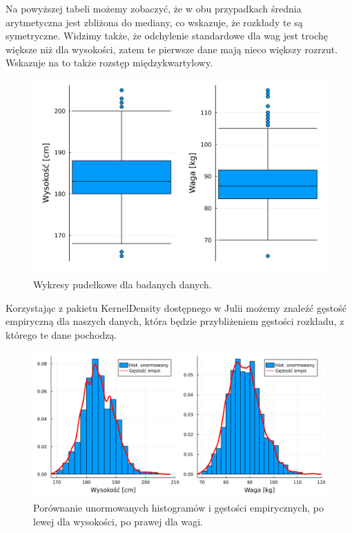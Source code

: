 \documentclass[12pt]{mwart}
\begin{document}
	Na powyższej tabeli możemy zobaczyć, że w obu przypadkach średnia arytmetyczna jest zbliżona do mediany, co wskazuje, że rozkłady te są symetryczne. Widzimy także, że odchylenie standardowe dla wag jest trochę większe niż dla wysokości, zatem te pierwsze dane mają nieco większy rozrzut. Wskazuje na to także rozstęp międzykwartylowy. 
	
	\begin{figure}[H]
		\centering
		\includegraphics[scale=0.1]{images/boxplot.png}
		\caption{Wykresy pudełkowe dla badanych danych.}
	\end{figure}
	
	\newpage
	Korzystając z pakietu KernelDensity dostępnego w Julii możemy znaleźć gęstość empiryczną dla naszych danych, która będzie przybliżeniem gęstości rozkładu, z którego te dane pochodzą.
	
	\begin{figure}[H]
		\centering
		\includegraphics[scale=0.1]{images/density.png}
		\caption{Porównanie unormowanych histogramów i gęstości empirycznych, po lewej dla wysokości, po prawej dla wagi.}
	\end{figure}
\end{document}

